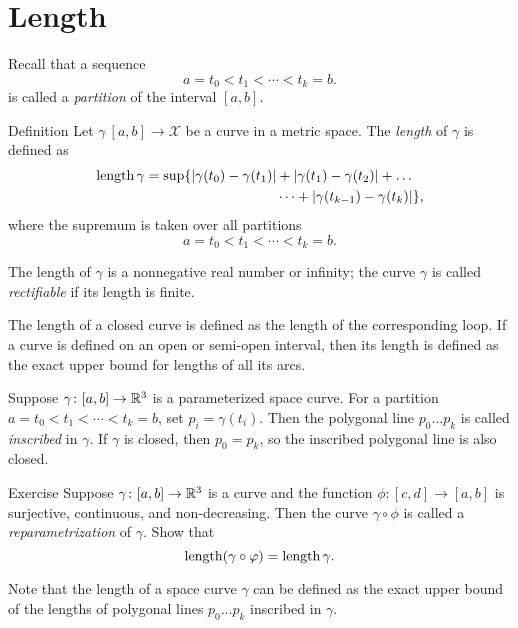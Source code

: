 \chapter{Length}
 
Recall that a sequence 
\[a=t_0 < t_1 < \cdots < t_k=b.\]
is called a \emph{partition} of the interval $[a,b]$.

\begin{thm}{Definition}\label{def:length}
Let $\gamma\:[a,b]\to \mathcal{X}$ be a curve in a metric space.
The \emph{length} of $\gamma$ is defined as
\begin{align*}
\mathop{\rm length}\nolimits \gamma
= 
\sup \{|\gamma(t_0)-\gamma(t_1)|&+|\gamma(t_1)-\gamma(t_2)|+\dots
\\
&\dots+|\gamma(t_{k-1})-\gamma(t_k)|\},
\end{align*}\index{$\length \gamma$}
where the supremum is taken over all partitions
\[a=t_0 < t_1 < \cdots < t_k=b.\]

The length of $\gamma$ is a nonnegative real number or infinity;
the curve $\gamma$ is called \emph{rectifiable} if its length is finite. 

The length of a closed curve is defined as the length of the corresponding loop.
If a curve is defined on an open or semi-open interval, then its length is defined as the exact upper bound for lengths of all its arcs.
\end{thm}

Suppose $\gamma\colon[a,b]\to \mathbb{R}^3$ is a parameterized space curve.
For a partition $a=t_0 < t_1 < \cdots < t_k=b$, set $p_i=\gamma(t_i)$.
Then the polygonal line $p_0\dots p_k$ is called \emph{inscribed} in $\gamma$.
If $\gamma$ is closed, then $p_0=p_k$, so the inscribed polygonal line is also closed.

\begin{thm}{Exercise}\label{ex:integral-length-0}
Suppose $\gamma\colon[a,b] \to\mathbb{R}^3$ is a curve and the function $\phi : [c,d] \to [a,b]$ is surjective, continuous, and non-decreasing.
Then the curve $\gamma \circ \phi$ is called a 
\emph{reparametrization} of $\gamma$.
Show that 
\[\mathop{\rm length}\nolimits (\gamma \circ \varphi) = \mathop{\rm length}\nolimits \gamma.\]

\end{thm}

Note that the length of a space curve $\gamma$ can be defined as the exact upper bound of the lengths of polygonal lines $p_0\dots p_k$ inscribed in $\gamma$.

